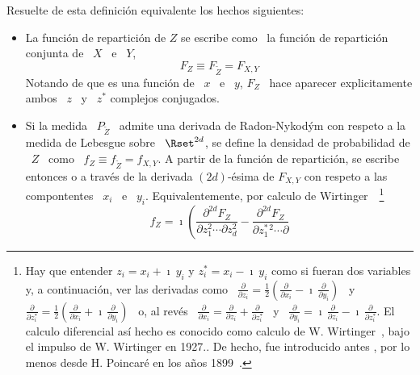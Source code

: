 Resuelte de esta definici\'on equivalente los hechos siguientes:
%
\begin{itemize}
\item La  funci\'on de repartici\'on  de $Z$ se  escribe como \ la  funci\'on de
  repartici\'on conjunta de \ $X$ \ e \ $Y$,
  \[
  F_Z \equiv F_{\widetilde{Z}} = F_{X,Y}
  \]
  Notando de  que es una  funci\'on de \  $x$ \ e \  $y$, $F_Z$ \  hace aparecer
  explicitamente ambos \ $z$ \ y \ $z^*$ complejos conjugados.
%
\item   Si  la   medida  \   $P_{\widetilde{Z}}$  \   admite  una   derivada  de
  Radon-Nykod\'ym con respeto a la medida  de Lebesgue sobre \ $\Rset^{2 d}$, se
  define  la  densidad   de  probabilidad  de  \  $Z$  \   como  \  $f_Z  \equiv
  f_{\widetilde{Z}} =  f_{X,Y}$. A partir  de la funci\'on de  repartici\'on, se
  escribe entonces o a trav\'es de  la derivada $(2 d)$-\'esima de $F_{X,Y}$ con
  respeto a las compontentes \ $x_i$  \ e \ $y_i$. Equivalentemente, por calculo
  de  Wirtinger~\cite{Rem91}~\footnote{Hay que entender  $z_i =  x_i +  \imath \
    y_i$  y $z_i^* =  x_i -  \imath \  y_i$ como  si fueran  dos variables  y, a
    continuaci\'on, ver  las derivadas  como \ $\frac{\partial}{\partial  z_i} =
    \frac12    \left(     \frac{\partial}{\partial    x_i}    -     \imath    \,
      \frac{\partial}{\partial  y_i} \right)$  \  y \  $\frac{\partial}{\partial
      z_i^*}  =  \frac12  \left(   \frac{\partial}{\partial  x_i}  +  \imath  \,
      \frac{\partial}{\partial    y_i}   \right)$    \   o,    al    rev\'es   \
    $\frac{\partial}{\partial    x_i}   =   \frac{\partial}{\partial    z_i}   +
    \frac{\partial}{\partial  z_i^*}$  \ y  \  $\frac{\partial}{\partial y_i}  =
    \imath \, \frac{\partial}{\partial z_i} - \imath \, \frac{\partial}{\partial
      z_i^*}$.
    El  calculo  diferencial  as\'i  hecho   es  conocido  como  calculo  de  W.
    Wirtinger~\cite{Rem91, Wir27}, bajo el impulso de W. Wirtinger en 1927..
    De hecho,  fue introducido antes , por  lo menos desde H.  Poincar\'e en los
    a\~nos 1899~\cite{Poi99}.\label{Foot:MP:Wirtinger}
}
  \[
  f_Z =  \imath \left( \frac{\partial^{2 d} F_Z}{\partial  z_1^2 \cdots \partial
      z_d^2} -  \frac{\partial^{2 d} F_Z}{\partial z_1^{* \,  2} \cdots \partial
}\]
\end{itemize}
